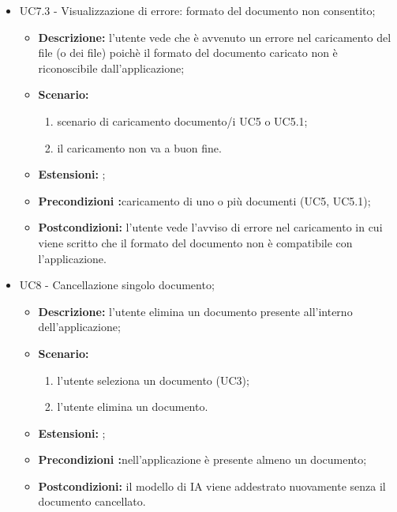 \documentclass[10pt, a4paper]{article}
\begin{document}
\begin{itemize}
    \item UC7.3 - Visualizzazione di errore: formato del documento non consentito;
    \begin{itemize}
    \item \textbf{Descrizione: }l'utente vede che è avvenuto un errore nel caricamento del file (o dei file) poichè il formato del documento caricato non è riconoscibile dall'applicazione;
        \item \textbf{Scenario: }
        \begin{enumerate}[label={\arabic*.}, align=left]
        \item scenario di caricamento documento/i UC5 o UC5.1;
        \item il caricamento non va a buon fine.
        \end{enumerate}
        \item \textbf{Estensioni: };
        \item \textbf{Precondizioni :}caricamento di uno o più documenti (UC5, UC5.1);
        \item \textbf{Postcondizioni:} l'utente vede l'avviso di errore nel caricamento in cui viene scritto che il formato del documento non è compatibile con l'applicazione.\\
    \end{itemize}
       
    \item UC8 - Cancellazione singolo documento;
    \begin{itemize}
        \item \textbf{Descrizione: }l'utente elimina un documento presente all'interno dell'applicazione;
        \item \textbf{Scenario: }
        \begin{enumerate}[label={\arabic*.}, align=left]
        \item l'utente seleziona un documento (UC3);
        \item l'utente elimina un documento.
        \end{enumerate}
        \item \textbf{Estensioni: };
        \item \textbf{Precondizioni :}nell'applicazione è presente almeno un documento;
        \item \textbf{Postcondizioni: }il modello di IA viene addestrato nuovamente senza il documento cancellato.\\
    \end{itemize}


\end{itemize}
\end{document}
